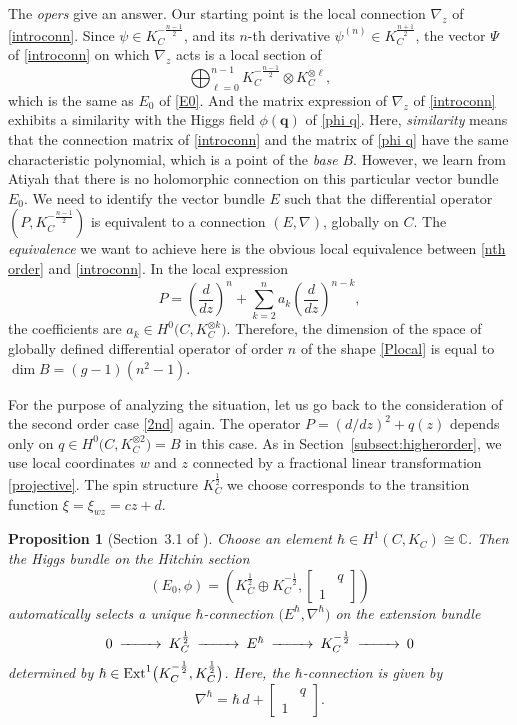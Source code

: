 \documentclass{amsart}
\newtheorem{prop}[thm]{Proposition}
\theoremstyle{definition}
\numberwithin{equation}{section}
\numberwithin{figure}{section}
\def\isom{\cong}
\def\tensor{\otimes}
\def\dsum{\oplus}
\def\Ext{{\text{\rm{Ext}}}}
\newcommand{\be}{\begin{equation}}
\newcommand{\ee}{\end{equation}}
\newcommand{\bC}{{\mathbb{C}}}
\newcommand{\half}{{\frac{1}{2}}}
\begin{document}
The \emph{opers} \cite{BD, BZF} give an answer. 
Our starting point is the 
local connection $\nabla_z$ of \eqref{introconn}. Since $\psi\in 
K_C^{-\frac{n-1}{2}}$, and its $n$-th derivative 
$\psi^{(n)}\in K_C^{\frac{n+1}{2}}$, the vector $\Psi$ of
\eqref{introconn} on which $\nabla_z$ acts is a local section of 
$$
\bigoplus_{\ell = 0}^{n-1} K_C^{-\frac{n-1}{2}}\tensor K_C^{\tensor \ell},
$$
which is the same as $E_0$ of \eqref{E0}. And the matrix 
expression of $\nabla_z$ of  \eqref{introconn} exhibits a similarity with 
the Higgs field $\phi(\mathbf{q})$ of \eqref{phi q}. Here, 
\emph{similarity} means that the connection matrix of \eqref{introconn}
and the matrix of \eqref{phi q} have the same characteristic polynomial, 
which is a point of the \emph{base} $B$.
However, we learn from Atiyah \cite{Atiyah} that
 there is no holomorphic connection on this particular vector 
 bundle $E_0$. 
We need to identify the vector bundle $E$ such that the
differential operator $\left(P, K_C^{-\frac{n-1}{2}}\right)$ is equivalent to 
a connection $(E,\nabla)$, globally on $C$.  The \emph{equivalence} 
we want to achieve here is the obvious
local equivalence between  \eqref{nth order} and \eqref{introconn}. 
In the local expression
\be
\label{Plocal}
P = \left(\frac{d}{dz}\right)^n + 
\sum_{k=2}^n a_k \left(\frac{d}{dz}\right)^{n-k},
\ee
the coefficients are $a_k\in H^0\big(C,K_C^{\tensor k}\big)$.
Therefore, the dimension of the space of globally defined differential 
operator of order $n$ of the  shape \eqref{Plocal}
is equal to $\dim B = (g-1)(n^2-1)$.



For the purpose of analyzing the situation, 
let us go back to the consideration of the second order case \eqref{2nd} again. 
The operator $P=(d/dz)^2+q(z)$ depends only on $q\in H^0\big(C,K_C^{\tensor 2}\big)=B$ in this case. 
As in Section~\ref{subsect:higherorder}, we use local coordinates
$w$ and $z$ connected by a fractional linear transformation 
\eqref{projective}. The spin structure $K_C^\half$ we choose corresponds
to the transition function $\xi=\xi_{wz} = cz+d$.



\begin{prop}[Section~3.1 of \cite{OM5}]
\label{2oper}
Choose an element $\hbar\in H^1(C,K_C)\isom \bC$. Then
the Higgs bundle on the Hitchin section
\be
\label{2Higgs}
(E_0,\phi) = \left(K_C^\half\dsum K_C^{-\half}, 
\begin{bmatrix} 
&q\\
1&
\end{bmatrix}
\right)
\ee
automatically selects a unique $\hbar$-connection $\big(E^\hbar, \nabla^\hbar\big)$
on the extension bundle 
\be
\label{ext}
\begin{CD}
0@>>> K_C^\half @>>>E^\hbar@>>>K_C^{-\half}@>>>0
\end{CD}
\ee
determined by $\hbar\in \Ext^1\big(K_C^{-\half}, K_C^{\half}
\big)$. Here, the $\hbar$-connection is given by 
\be
\label{hbar-conn}
\nabla^\hbar = \hbar\,d + \begin{bmatrix} 
&q\\
1&
\end{bmatrix}.
\ee
\end{prop}
\end{document}
